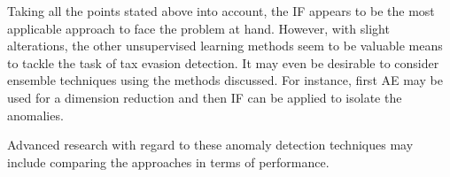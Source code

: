 Taking all the points stated above into account, the \ac{IF} appears to be the most applicable approach to face the problem at hand. However, with slight alterations, the other unsupervised learning methods seem to be valuable means to tackle the task of tax evasion detection.
It may even be desirable to consider ensemble techniques using the methods discussed. For instance, first \ac{AE} may be used for a dimension reduction and then \ac{IF} can be applied to isolate the anomalies.

Advanced research with regard to these anomaly detection techniques may include comparing the approaches in terms of performance.
